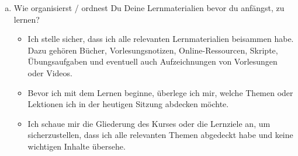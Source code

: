 \documentclass[10pt, oneside]{article}
\begin{document}
\begin{enumerate}[(a)]
    \item Wie organisierst / ordnest Du Deine Lernmaterialien bevor du anfängst, zu lernen?

        \begin{itemize}
            \item Ich stelle sicher, dass ich alle relevanten Lernmaterialien
                beisammen habe. Dazu gehören Bücher, Vorlesungsnotizen,
                Online-Ressourcen, Skripte, Übungsaufgaben und eventuell auch
                Aufzeichnungen von Vorlesungen oder Videos.
            \item Bevor ich mit dem Lernen beginne, überlege ich mir, welche
                Themen oder Lektionen ich in der heutigen Sitzung abdecken
                möchte.
            \item Ich schaue mir die Gliederung des Kurses oder die Lernziele
                an, um sicherzustellen, dass ich alle relevanten Themen
                abgedeckt habe und keine wichtigen Inhalte übersehe.
        \end{itemize}

\end{enumerate}
\end{document}
